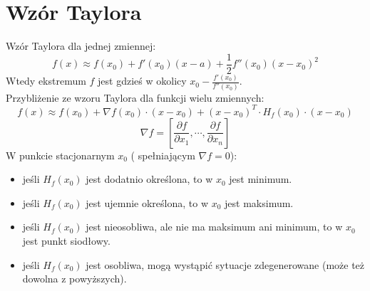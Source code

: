 \section{Wzór Taylora}
Wzór Taylora dla jednej zmiennej:
\[
	f(x) \approx f(x_0) + f'(x_0)(x - a) + \frac{1}{2}f''(x_0)(x - x_0)^2
\]
Wtedy ekstremum \( f \) jest gdzieś w okolicy \( x_0 - \frac{f'(x_0)}{f''(x_0)} \). \\
Przybliżenie ze wzoru Taylora dla funkcji wielu zmiennych:
\[
	f(x) \approx f(x_0) + \nabla f(x_0) \cdot (x - x_0) + (x - x_0)^T \cdot H_f(x_0) \cdot (x - x_0)
\]
\[
	\nabla f = \left[ \frac{\partial f}{\partial x_1}, \cdots, \frac{\partial f}{\partial x_n} \right]
\]
W punkcie stacjonarnym \( x_0 \) ( spełniającym \( \nabla f = 0 \)):
\begin{itemize}
	\onehalfspacing
	\item jeśli \( H_f(x_0) \) jest dodatnio określona, to w \( x_0 \) jest minimum.
	\item jeśli \( H_f(x_0) \) jest ujemnie określona, to w \( x_0 \) jest maksimum.
	\item jeśli \( H_f(x_0) \) jest nieosobliwa, ale nie ma maksimum ani minimum, to w \( x_0 \) jest punkt siodłowy.
	\item jeśli \( H_f(x_0) \) jest osobliwa, mogą wystąpić sytuacje zdegenerowane (może też dowolna \linebreak z powyższych).
\end{itemize}